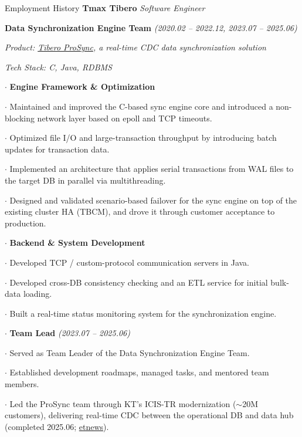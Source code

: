 \begin{rubric}{Employment History}
\entry*[2020.02 -- 2025.06]%
	\textbf{Tmax Tibero} \enspace\emph{Software Engineer}\par

	\quad \textbf{Data Synchronization Engine Team} \textit{\small(2020.02 -- 2022.12, 2023.07 -- 2025.06)}\par
	\textit{\small Product: \href{https://www.tibero.com/ko/products/ProSync}{\textcolor[rgb]{0.5, 0, 0.13}{Tibero ProSync}}, a real-time CDC data synchronization solution}\par
	\textit{\small Tech Stack: C, Java, RDBMS}\par
	\quad $\cdot$ \textbf{Engine Framework \& Optimization}\par
	\hangindent=1cm  %
	$\cdot$ Maintained and improved the C-based sync engine core and introduced a non-blocking network layer based on epoll and TCP timeouts.\par
	\hangindent=1cm  %
	$\cdot$ Optimized file I/O and large-transaction throughput by introducing batch updates for transaction data.\par
	\hangindent=1cm  %
	$\cdot$ Implemented an architecture that applies serial transactions from WAL files to the target DB in parallel via multithreading.\par
	\hangindent=1cm  %
	$\cdot$ Designed and validated scenario-based failover for the sync engine on top of the existing cluster HA (TBCM), and drove it through customer acceptance to production.\par

	\quad $\cdot$ \textbf{Backend \& System Development}\par
	\hangindent=1cm  %
	$\cdot$ Developed TCP / custom-protocol communication servers in Java.\par
	\hangindent=1cm  %
	$\cdot$ Developed cross-DB consistency checking and an ETL service for initial bulk-data loading.\par
	\hangindent=1cm  %
	$\cdot$ Built a real-time status monitoring system for the synchronization engine.\par

	\quad $\cdot$ \textbf{Team Lead} \textit{\small(2023.07 -- 2025.06)}\par
	\hangindent=1cm  %
	$\cdot$ Served as Team Leader of the Data Synchronization Engine Team.\par
	\hangindent=1cm  %
	$\cdot$ Established development roadmaps, managed tasks, and mentored team members.\par
	\hangindent=1cm  %
	$\cdot$ Led the ProSync team through KT's ICIS-TR modernization ($\sim$20M customers), delivering real-time CDC between the operational DB and data hub (completed 2025.06; \href{https://www.etnews.com/20250626000169}{\textcolor[rgb]{0.5, 0, 0.13}{etnews}}).\par


\end{rubric}
